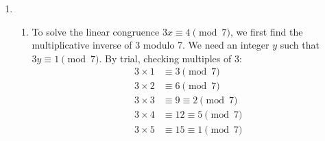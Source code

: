 \documentclass[a4paper]{article}
\begin{document}
\begin{enumerate}
        \newpage
        \item \begin{enumerate}
            \item To solve the linear congruence \(3x \equiv 4 \pmod{7}\), we first find the multiplicative inverse of 3 modulo 7. We need an integer \(y\) such that \(3y \equiv 1 \pmod{7}\). By trial, checking multiples of 3:
            \[
                \begin{split}
                    3 \times 1 &\equiv 3 \pmod{7} \\
                    3 \times 2 &\equiv 6 \pmod{7} \\
                    3 \times 3 &\equiv 9 \equiv 2 \pmod{7} \\
                    3 \times 4 &\equiv 12 \equiv 5 \pmod{7} \\
                    3 \times 5 &\equiv 15 \equiv 1 \pmod{7}
                \end{split}
            \]


\end{enumerate}
\end{enumerate}
\end{document}
